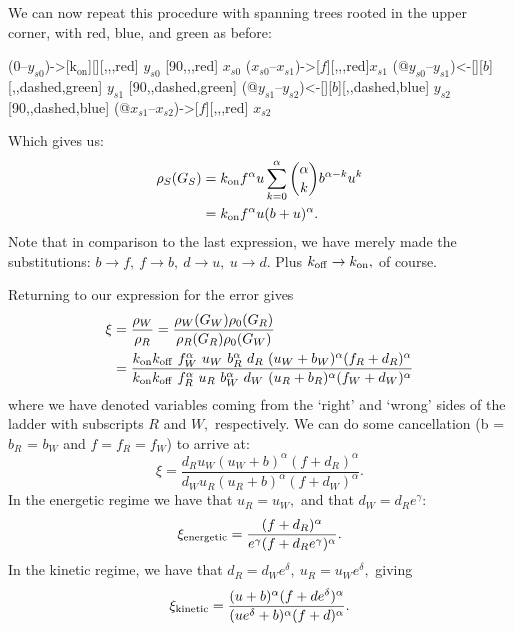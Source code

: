 We can now repeat this procedure with spanning trees rooted in the upper corner, with red, blue, and green as before:

\begin{center}
 \arrow(0--$y_{s0}$){->[$\mathrm{k_{on}}$][]}[,,,red] $y_{s0}$
\arrow{->[$u$][$$]}[90,,,red] 
$x_{s0}$ \arrow($x_{s0}$--$x_{s1}$){->[$f$]}[,,,red]$x_{s1}$
\arrow(@$y_{s0}$--$y_{s1}$){<-[][$b$]}[,,dashed,green] $y_{s1}$ \arrow{->[$u$][$$]}[90,,dashed,green]
\arrow(@$y_{s1}$--$y_{s2}$){<-[][$b$]}[,,dashed,blue] $y_{s2}$
\arrow{->[$u$][$$]}[90,,dashed,blue] 
\arrow(@$x_{s1}$--$x_{s2}$){->[$f$]}[,,,red] $x_{s2}$
\schemestop
\end{center}


Which gives us:
\[
\begin{aligned}
\rho_S(G_S) &= k_{\rm on}f^\alpha u \sum_{k=0}^\alpha {\alpha\choose k}b^{\alpha-k}u^k\\
&=k_{\rm on}f^\alpha u (b + u)^\alpha.
\end{aligned}
\]
Note that in comparison to the last expression, we have merely made the substitutions: $b\to f, \ f \to b, \ d \to u, \  u \to d.$  Plus $k_{\rm off}\to k_{\rm on},$ of course.

Returning to our expression for the error gives
\[
\begin{aligned}
\xi &= \frac{\rho_W}{\rho_R} = \frac{\rho_W(G_W)\rho_0(G_R)}{\rho_R(G_R)\rho_0(G_W)}\\
&= \frac{k_{\rm on}k_{\rm off}\  f_W^\alpha \ u_W \ b_R^\alpha \  d_R \  (u_W + b_W)^\alpha(f_R+d_R)^\alpha }{k_{\rm on}k_{\rm off}\  f_R^\alpha \ u_R \ b_W^\alpha \  d_W \  (u_R + b_R)^\alpha(f_W+d_W)^\alpha }
\end{aligned}
\]
where we have denoted variables coming from the `right' and `wrong' sides of the ladder with subscripts $R$ and $W,$ respectively.  We can do some cancellation (b = $b_R$ = $b_W$ and $f = f_R = f_W$) to arrive at:
\[
\xi = \frac{d_Ru_W(u_W+b)^{\alpha}(f+d_R)^\alpha}{d_Wu_R(u_R+b)^{\alpha}(f+d_W)^\alpha}.
\]
In the energetic regime we have that $u_R = u_W,$ and that $d_W = d_Re^\gamma:$
\[
\xi_{\rm energetic} = \frac{(f+d_R)^\alpha}{e^\gamma(f+d_Re^\gamma)^\alpha}.
\]
%
In the kinetic regime, we have that $d_R = d_We^\delta, \ u_R = u_We^\delta,$ giving 
%
\[
\xi_{\rm kinetic} =  \frac{(u+b)^\alpha(f+de^\delta)^\alpha}{(ue^\delta+b)^\alpha(f+d)^\alpha}.
\]
